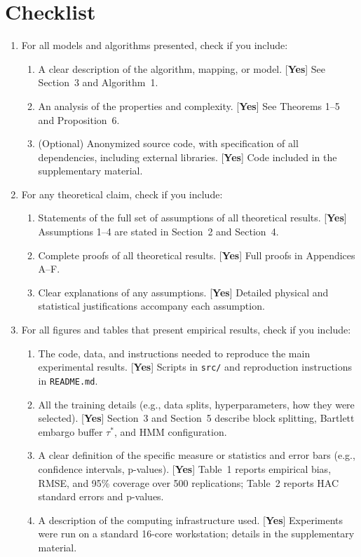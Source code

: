 \documentclass[twoside]{article}
\theoremstyle{definition}
\begin{document}
\section*{Checklist}
\begin{enumerate}
\item For all models and algorithms presented, check if you include:
\begin{enumerate}
  \item A clear description of the algorithm, mapping, or model. [\textbf{Yes}] See Section~3 and Algorithm~1.
  \item An analysis of the properties and complexity. [\textbf{Yes}] See Theorems 1--5 and Proposition~6.
  \item (Optional) Anonymized source code, with specification of all dependencies, including external libraries. [\textbf{Yes}] Code included in the supplementary material.
\end{enumerate}

\item For any theoretical claim, check if you include:
\begin{enumerate}
  \item Statements of the full set of assumptions of all theoretical results. [\textbf{Yes}] Assumptions 1--4 are stated in Section~2 and Section~4.
  \item Complete proofs of all theoretical results. [\textbf{Yes}] Full proofs in Appendices A--F.
  \item Clear explanations of any assumptions. [\textbf{Yes}] Detailed physical and statistical justifications accompany each assumption.
\end{enumerate}

\item For all figures and tables that present empirical results, check if you include:
\begin{enumerate}
  \item The code, data, and instructions needed to reproduce the main experimental results. [\textbf{Yes}] Scripts in \texttt{src/} and reproduction instructions in \texttt{README.md}.
  \item All the training details (e.g., data splits, hyperparameters, how they were selected). [\textbf{Yes}] Section~3 and Section~5 describe block splitting, Bartlett embargo buffer $\tau^*$, and HMM configuration.
  \item A clear definition of the specific measure or statistics and error bars (e.g., confidence intervals, p-values). [\textbf{Yes}] Table~1 reports empirical bias, RMSE, and 95\% coverage over 500 replications; Table~2 reports HAC standard errors and p-values.
  \item A description of the computing infrastructure used. [\textbf{Yes}] Experiments were run on a standard 16-core workstation; details in the supplementary material.
\end{enumerate}


\end{enumerate}
\end{document}
